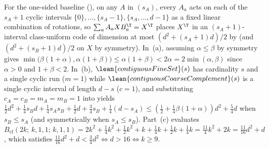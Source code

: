 \begin{outline}
For the one-sided baseline (), on any $A$ in
$(s_A)$,
every $A_a$ acts on each of the $s_A + 1$ cyclic intervals $\{0\}, \dots, \{s_A - 1\},
\{s_A, \dots, d - 1\}$ as a fixed linear combination of rotations, so $\sum_a A_a X B_a^{\T} = X^{\T}$
places $X^{\T}$ in an $(s_A + 1)$-interval class-uniform code of dimension at most
$(d^2 + (s_A + 1)d)/2$ by \cite[Theorem~6.4]{SeventeenthPaper2026} (and $(d^2 + (s_B + 1)d)/2$ on
$X$ by symmetry). In~(a), assuming $\alpha \le \beta$ by symmetry gives
$\min\bigl(\beta(1+\alpha), \alpha(1+\beta)\bigr) \le \alpha(1+\beta) < 2\alpha = 2\min(\alpha,\beta)$
since $\alpha > 0$ and $1 + \beta < 2$. In~(b), $\lean{contiguousFineSet}(s)$ has cardinality $s$ and
a single cyclic run ($m = 1$) while $\lean{contiguousCoarseComplement}(s)$ is a single cyclic interval
of length $d - s$ ($c = 1$), and substituting $c_A = c_B = m_A = m_B = 1$ into
 yields
$\frac{1}{2}d^2 + \frac{1}{4}s_B d + \frac{1}{4}s_A s_B + \frac{1}{2}d + \frac{3}{4}s_B +
\frac{1}{4}(d - s_A) \le (\frac{1}{2} + \frac{1}{4}\beta(1+\alpha))d^2 + \frac{5}{4}d$ when
$s_B \le s_A$ (and symmetrically when $s_A \le s_B$). Part~(c) evaluates
$B_{\mathrm{cf}}(2k;\, k,1,1;\, k,1,1) = 2k^2 + \frac{1}{4}k^2 + \frac{1}{2}k^2 + k + \frac{1}{4}k +
\frac{1}{2}k + \frac{1}{4}k = \frac{11}{4}k^2 + 2k = \frac{11}{16}d^2 + d$, which satisfies
$\frac{11}{16}d^2 + d < \frac{3}{4}d^2 \iff d > 16 \iff k \ge 9$.
\end{outline}

